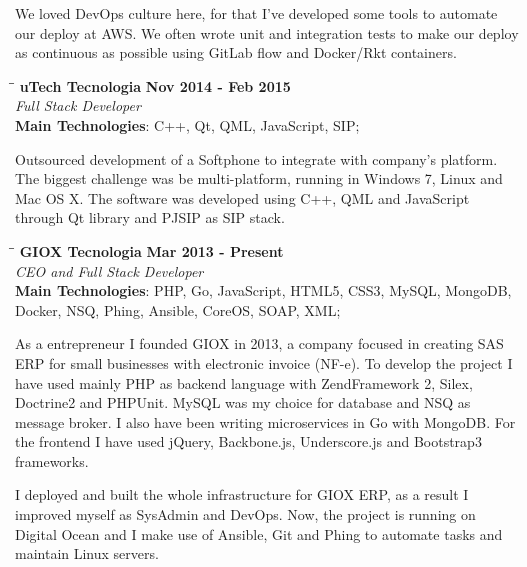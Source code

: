 \documentclass[margin]{res}
\begin{document}
\begin{resume}
We loved DevOps culture here, for that I've developed some tools to automate our deploy at AWS. We often wrote unit and integration tests to make our deploy as continuous as possible using GitLab flow and Docker/Rkt containers.

\newpage

\vspace{-0.1in}
    \begin{tabbing}
    \hspace{2.3in}\= \hspace{1.7in}\= \kill
    \textbf{uTech Tecnologia}    \>\>\textbf{Nov 2014 - Feb 2015}\\
    \textit{Full Stack Developer}\\
    \textbf{Main Technologies}: C++, Qt, QML, JavaScript, SIP;
    \end{tabbing}\vspace{-20pt}
    \vspace{2mm}
Outsourced development of a Softphone to integrate with company’s platform. The biggest challenge was be multi-platform, running in Windows 7, Linux and Mac OS X. The software was developed using C++, QML and JavaScript through Qt library and PJSIP as SIP stack.

\vspace{-0.1in}
    \begin{tabbing}
    \hspace{2.3in}\= \hspace{1.7in}\= \kill
    \textbf{GIOX Tecnologia}    \>\>\textbf{Mar 2013 - Present}\\
    \textit{CEO and Full Stack Developer}\\
    \textbf{Main Technologies}: PHP, Go, JavaScript, HTML5, CSS3, MySQL, MongoDB,\\Docker, NSQ, Phing, Ansible, CoreOS, SOAP, XML;
    \end{tabbing}\vspace{-20pt}
    \vspace{2mm}
As a entrepreneur I founded GIOX in 2013, a company focused in creating SAS ERP for small businesses with electronic invoice (NF-e). To develop the project I have used mainly PHP as backend language with ZendFramework 2, Silex, Doctrine2 and PHPUnit. MySQL was my choice for database and NSQ as message broker. I also have been writing microservices in Go with MongoDB. For the frontend I have used jQuery, Backbone.js, Underscore.js and Bootstrap3 frameworks.

I deployed and built the whole infrastructure for GIOX ERP, as a result I improved myself as SysAdmin and DevOps. Now, the project is running on Digital Ocean and I make use of Ansible, Git and Phing to automate tasks and maintain Linux servers.


\end{resume}
\end{document}
